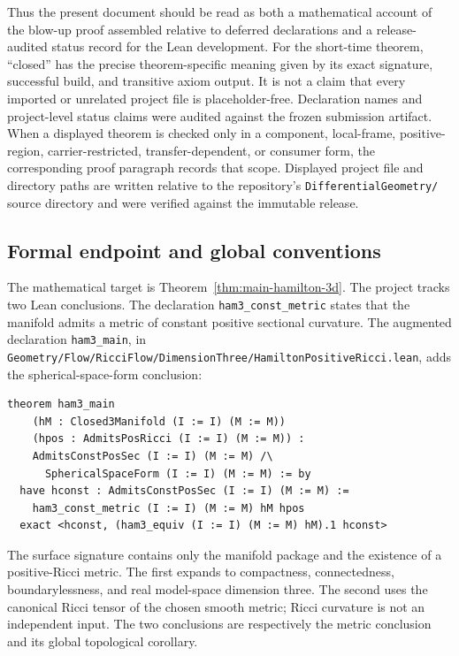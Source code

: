 \documentclass[11pt]{article}
\theoremstyle{plain}
\theoremstyle{definition}
\theoremstyle{remark}
\newcommand{\leanref}[1]{\nolinkurl{#1}}
\newcommand{\leanfile}[1]{\nolinkurl{#1}}
\newcommand{\rffile}[1]{\leanfile{#1}}
\begin{document}
Thus the present document should be read as both a mathematical account of
the blow-up proof assembled relative to deferred declarations and a
release-audited status record for the Lean development.
For the short-time theorem, ``closed'' has the precise theorem-specific meaning
given by its exact signature, successful build, and transitive axiom output.
It is not a claim that every imported or unrelated project file is
placeholder-free.  Declaration names and project-level status claims were
audited against the frozen submission artifact.
When a displayed theorem is checked only in a component, local-frame,
positive-region, carrier-restricted, transfer-dependent, or consumer form, the
corresponding proof paragraph records that scope.
Displayed project file and directory paths are written relative to the
repository's \texttt{DifferentialGeometry/} source directory and were verified
against the immutable release.

\subsection{Formal endpoint and global conventions}
\label{subsec:main-lean-endpoint}

The mathematical target is Theorem~\ref{thm:main-hamilton-3d}.  The project
tracks two Lean conclusions.  The declaration \leanref{ham3_const_metric}
states that the manifold admits a metric of constant positive sectional
curvature.  The augmented declaration \leanref{ham3_main}, in
\rffile{Geometry/Flow/RicciFlow/DimensionThree/HamiltonPositiveRicci.lean},
adds the spherical-space-form conclusion:

\begin{Verbatim}[breaklines=true,breakanywhere=true,fontsize=\small]
theorem ham3_main
    (hM : Closed3Manifold (I := I) (M := M))
    (hpos : AdmitsPosRicci (I := I) (M := M)) :
    AdmitsConstPosSec (I := I) (M := M) /\
      SphericalSpaceForm (I := I) (M := M) := by
  have hconst : AdmitsConstPosSec (I := I) (M := M) :=
    ham3_const_metric (I := I) (M := M) hM hpos
  exact <hconst, (ham3_equiv (I := I) (M := M) hM).1 hconst>
\end{Verbatim}

The surface signature contains only the manifold package and the existence of
a positive-Ricci metric.  The first expands to compactness, connectedness,
boundarylessness, and real model-space dimension three.  The second uses the
canonical Ricci tensor of the chosen smooth metric; Ricci curvature is not an
independent input.  The two conclusions are respectively the metric conclusion
and its global topological corollary.
\end{document}
